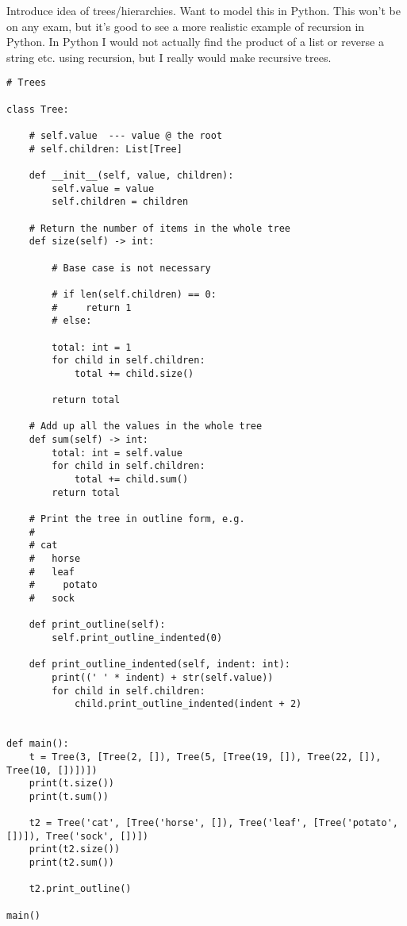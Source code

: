 \documentclass{article}
\newcommand{\notready}{\textcolor{red}{\XSolidBold}\xspace}
\begin{document}
Introduce idea of trees/hierarchies.  Want to model this in Python.
This won't be on any exam, but it's good to see a more realistic
example of recursion in Python.  In Python I would not actually find
the product of a list or reverse a string etc. using recursion, but I
really would make recursive trees.

\begin{verbatim}
# Trees

class Tree:

    # self.value  --- value @ the root
    # self.children: List[Tree]

    def __init__(self, value, children):
        self.value = value
        self.children = children

    # Return the number of items in the whole tree
    def size(self) -> int:

        # Base case is not necessary

        # if len(self.children) == 0:
        #     return 1
        # else:

        total: int = 1
        for child in self.children:
            total += child.size()

        return total

    # Add up all the values in the whole tree
    def sum(self) -> int:
        total: int = self.value
        for child in self.children:
            total += child.sum()
        return total

    # Print the tree in outline form, e.g.
    #
    # cat
    #   horse
    #   leaf
    #     potato
    #   sock

    def print_outline(self):
        self.print_outline_indented(0)

    def print_outline_indented(self, indent: int):
        print((' ' * indent) + str(self.value))
        for child in self.children:
            child.print_outline_indented(indent + 2)


def main():
    t = Tree(3, [Tree(2, []), Tree(5, [Tree(19, []), Tree(22, []), Tree(10, [])])])
    print(t.size())
    print(t.sum())

    t2 = Tree('cat', [Tree('horse', []), Tree('leaf', [Tree('potato', [])]), Tree('sock', [])])
    print(t2.size())
    print(t2.sum())

    t2.print_outline()

main()
\end{verbatim}

\end{document}
